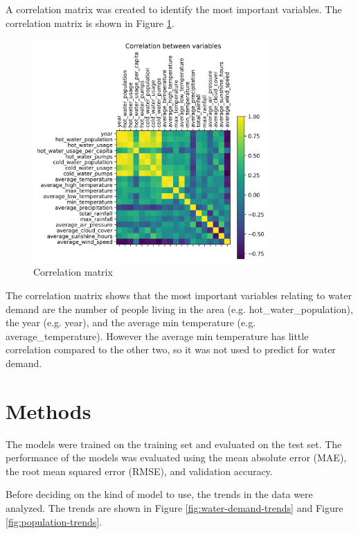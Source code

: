 \documentclass{article}
\begin{document}
A correlation matrix was created to identify the most important variables. The correlation matrix is shown in Figure \ref{fig:correlation-matrix}.

\begin{figure}[h]
    \centering
    \includegraphics[width=0.8\textwidth]{../figures/correlation.png}
    \caption{Correlation matrix}
    \label{fig:correlation-matrix}
\end{figure}

The correlation matrix shows that the most important variables relating to water demand are the number of people living in the area (e.g. hot\_water\_population), the year (e.g. year), and the average min temperature (e.g. average\_temperature). However the average min temperature has little correlation compared to the other two, so it was not used to predict for water demand.

\section{Methods}
The models were trained on the training set and evaluated on the test set. The performance of the models was evaluated using the mean absolute error (MAE), the root mean squared error (RMSE), and validation accuracy.

Before deciding on the kind of model to use, the trends in the data were analyzed. The trends are shown in Figure \ref{fig:water-demand-trends} and Figure \ref{fig:population-trends}.
\end{document}
